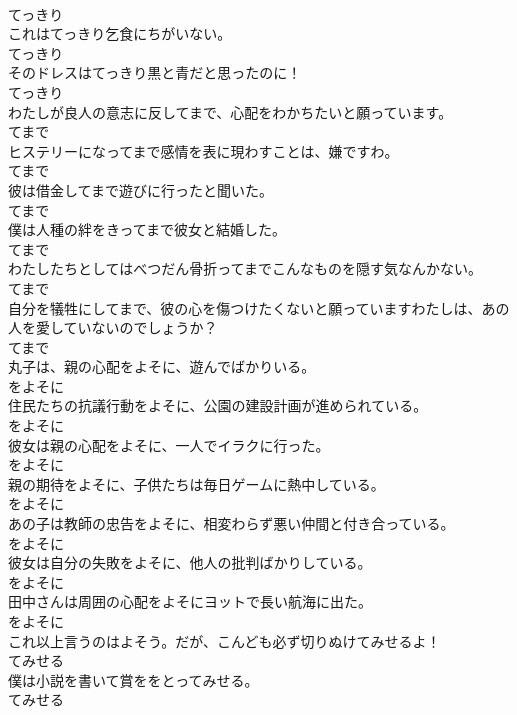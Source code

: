 \documentclass[8pt]{extreport}
\begin{document}
\begin{CJK}{UTF8}{min}
\\	てっきり
\\	これはてっきり乞食にちがいない。	
\\	てっきり
\\	そのドレスはてっきり黒と青だと思ったのに！	
\\	てっきり
\\	わたしが良人の意志に反してまで、心配をわかちたいと願っています。	
\\	てまで
\\	ヒステリーになってまで感情を表に現わすことは、嫌ですわ。	
\\	てまで
\\	彼は借金してまで遊びに行ったと聞いた。	
\\	てまで
\\	僕は人種の絆をきってまで彼女と結婚した。	
\\	てまで
\\	わたしたちとしてはべつだん骨折ってまでこんなものを隠す気なんかない。	
\\	てまで
\\	自分を犠牲にしてまで、彼の心を傷つけたくないと願っていますわたしは、あの人を愛していないのでしょうか？	
\\	てまで
\\	丸子は、親の心配をよそに、遊んでばかりいる。	
\\	をよそに
\\	住民たちの抗議行動をよそに、公園の建設計画が進められている。	
\\	をよそに
\\	彼女は親の心配をよそに、一人でイラクに行った。	
\\	をよそに
\\	親の期待をよそに、子供たちは毎日ゲームに熱中している。	
\\	をよそに
\\	あの子は教師の忠告をよそに、相変わらず悪い仲間と付き合っている。	
\\	をよそに
\\	彼女は自分の失敗をよそに、他人の批判ばかりしている。	
\\	をよそに
\\	田中さんは周囲の心配をよそにヨットで長い航海に出た。	
\\	をよそに
\\	これ以上言うのはよそう。だが、こんども必ず切りぬけてみせるよ！	
\\	てみせる
\\	僕は小説を書いて賞ををとってみせる。	
\\	てみせる

\end{CJK}
\end{document}
